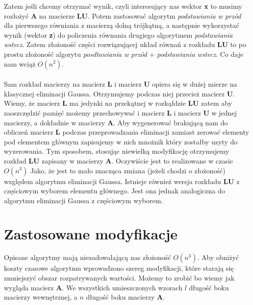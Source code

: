 \documentclass[]{article}
\begin{document}
Zatem jeśli chcemy otrzymać wynik, czyli interesujący nas wektor \textbf{x} to musimy rozłożyć \textbf{A} na macierze \textbf{LU}. Potem zastosować algorytm \textit{podstawiania w przód} dla pierwszego równiania z macierzą dolną trójkątną, a następnie wykorzystać wynik (wektor \textbf{z}) do policzenia równania drugiego algorytmem \textit{podstawiania wstecz}. Zatem złożoność części rozwiązującej układ równań z rozkładu \textbf{LU} to po prostu złożoność algorytu \textit{posdtawiania w przód} + \textit{podstawiania wstecz}. Co daje nam wciąż $O(n^2)$.
\\\\
Sam rozkład macierzy na macierz \textbf{L} i macierz \textbf{U} opiera się w dużej mierze na klasycznej eliminacji Gaussa. Otrzymujemy podczas niej przecież macierz \textbf{U}. Wiemy, że macierz \textbf{L} ma jedynki na przekątnej w rozkąłdzie \textbf{LU} zatem aby zaoszczędzić pamięć możemy przechowywać i macierz \textbf{L} i macierz \textbf{U} w jednej macierzy, a dokładnie w macierzy \textbf{A}. Aby wygenerować brakującą nam do obliczeń macierz \textbf{L} podczas przeprowadzania eliminacji zamiast zerować elementy pod elementem głównym zapisujemy w nich mnożnik który zostałby uzyty do wyzerowania. Tym sposobem, stosując niewielką modyfikację otrzymujemy rozkład \textbf{LU} zapisany w macierzy \textbf{A}. Oczywiście jest to realizowane w czasie $O(n^3)$ Jako, że jest to mało znacząca zmiana (jeżeli chodzi o złożoność) względem algorytmu eliminacji Gaussa.
Istnieje również wersja rozkładu \textbf{LU} z częściowym wyborem elementu głównego. Jest ona jednak analogiczna do algorytmu eliminacji Gaussa z częściowym wyborem.
\section{Zastosowane modyfikacje}
Opisane algorytmy mają niezadowalającą nas złożoność $O(n^3)$. Aby obniżyć koszty czasowe algorytmu wprowadzono szereg modyfikacji, które starają się zmniejszyć obszar rozpatrywanych wartości. Możemy to zrobić bo wiemy jak wygląda macierz \textbf{A}. We wszystkich umieszczonych wzorach $l$ długość boku macierzy wewnętrznej, a $n$ długość boku macierzy \textbf{A}.  
\end{document}
